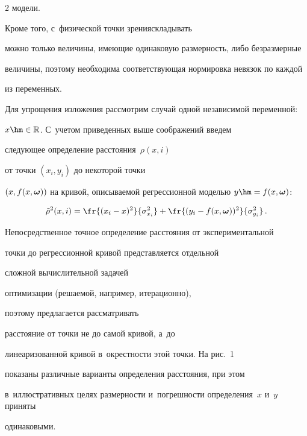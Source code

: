 \begin{multicols}{2}
 модели.

Кроме того, с~физической точки зрения\linebreak складывать

можно только величины, име\-ющие одинаковую раз\-мер\-ность, либо безразмерные

величины, поэтому необходима соответствующая нормировка невязок по каждой

из переменных.



Для упрощения изложения рассмотрим случай одной независимой переменной:

$x \hm\in \mathbb{R}$. С~учетом приведенных выше соображений введем

сле\-ду\-ющее определение расстояния~$\rho(x, i)$

от точки $(x_i, y_i)$ до некоторой точ\-ки

$(x, f(x, \bomega))$ на кривой, описываемой регрессионной моделью $y \hm= f(x, 

\bomega)$:

\begin{equation}

  \tilde{\rho}^2(x, i) = \fr{(x_i - x)^2}{\sigma_{x_i}^2} + \fr{(y_i - f(x, 

\bomega))^2}{\sigma_{y_i}^2}\,.

  \label{eq:dist0}

\end{equation}







Непосредственное точное определение расстояния от экспериментальной

точки до регрессионной кривой представляется отдельной

сложной вы\-чис\-ли\-тель\-ной задачей

оптимизации (решаемой, например, итерационно),

поэтому предлагается рассматривать

расстояние от точки не до самой кривой, а~до

линеаризованной кривой в~окрестности этой точки. На рис.~1

показаны различные варианты определения рас\-сто\-яния, при этом

в~иллюстративных целях раз\-мер\-ности и~по\-греш\-ности определения~$x$ и~$y$ приняты

одинаковыми.




\end{multicols}

